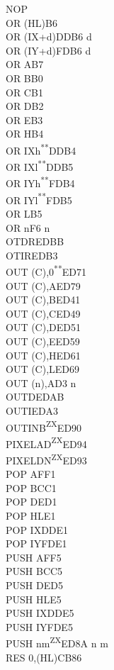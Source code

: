 \documentclass[twoside,openright,a4paper]{book}
\newcommand{\UNDOC}{\textnormal{\textsuperscript{**}}}
\newcommand{\ZXN}{\textnormal{\textsuperscript{ZX}}}
\begin{document}
\begin{multicols}{3}
{\begin{tabbing}
	NOP\\
	OR (HL)\>B6\\
	OR (IX+d)\>DDB6 d\\
	OR (IY+d)\>FDB6 d\\
	OR A\>B7\\
	OR B\>B0\\
	OR C\>B1\\
	OR D\>B2\\
	OR E\>B3\\
	OR H\>B4\\
	OR IXh\UNDOC\>DDB4\\
	OR IXl\UNDOC\>DDB5\\
	OR IYh\UNDOC\>FDB4\\
	OR IYl\UNDOC\>FDB5\\
	OR L\>B5\\
	OR n\>F6 n\\
	OTDR\>EDBB\\
	OTIR\>EDB3\\
	OUT (C),0\UNDOC\>ED71\\
	OUT (C),A\>ED79\\
	OUT (C),B\>ED41\\
	OUT (C),C\>ED49\\
	OUT (C),D\>ED51\\
	OUT (C),E\>ED59\\
	OUT (C),H\>ED61\\
	OUT (C),L\>ED69\\
	OUT (n),A\>D3 n\\
	OUTD\>EDAB\\
	OUTI\>EDA3\\
	OUTINB\ZXN\>ED90\\
	PIXELAD\ZXN\>ED94\\
	PIXELDN\ZXN\>ED93\\
	POP AF\>F1\\
	POP BC\>C1\\
	POP DE\>D1\\
	POP HL\>E1\\
	POP IX\>DDE1\\
	POP IY\>FDE1\\
	PUSH AF\>F5\\
	PUSH BC\>C5\\
	PUSH DE\>D5\\
	PUSH HL\>E5\\
	PUSH IX\>DDE5\\
	PUSH IY\>FDE5\\
	PUSH nm\ZXN\>ED8A n m\\
	RES 0,(HL)\>CB86\\

\end{tabbing}}
\end{multicols}
\end{document}
